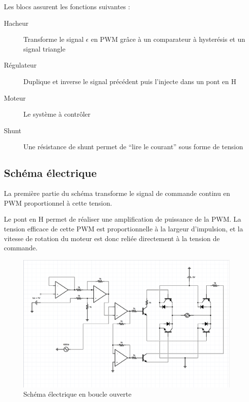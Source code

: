 \documentclass[a4paper]{article}
\begin{document}

Les blocs assurent les fonctions suivantes :
\begin{description}
  \item[Hacheur] 	Transforme le signal $\epsilon$ en PWM grâce à un comparateur à hysterésis et un signal triangle
  \item[Régulateur] Duplique et inverse le signal précédent puis l'injecte dans un pont en H
  \item[Moteur] 	Le système à contrôler
  \item[Shunt] 		Une résistance de shunt permet de “lire le courant” sous forme de tension
\end{description}

\subsection{Schéma électrique}

La première partie du schéma transforme le signal de commande continu en PWM proportionnel à cette tension.

Le pont en H permet de réaliser une amplification de puissance de la PWM. La tension efficace de cette PWM est proportionnelle à la largeur d'impulsion, et la vitesse de rotation du moteur est donc reliée directement à la tension de commande.

\begin{figure}[H]
\centering
	\includegraphics[width=1\textwidth]{schema.png}
	\caption{Schéma électrique en boucle ouverte}
\end{figure}
\end{document}
